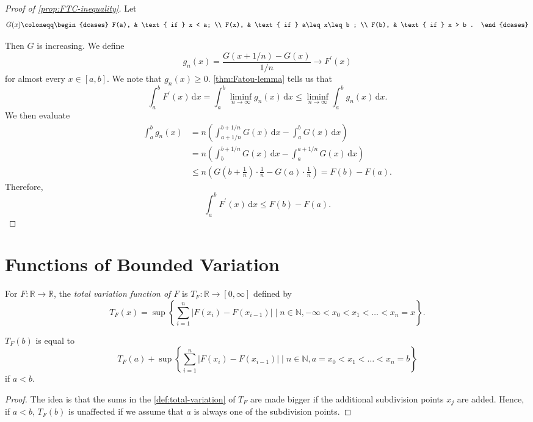 \begin{proof}[Proof of \autoref{prop:FTC-inequality}]
	Let
	\[
		G(x)\coloneqq \begin{dcases}
			F(a), & \text{ if } x < a;          \\
			F(x), & \text{ if } a\leq x\leq b ; \\
			F(b), & \text{ if } x > b .
		\end{dcases}
	\]

	Then \(G\) is increasing. We define
	\[
		g_n(x) = \frac{G(x+1/n)- G(x)}{1/n} \to F^\prime (x)
	\]
	for almost every \(x \in [a,b]\). We note that \(g_n(x) \geq 0\). \autoref{thm:Fatou-lemma} tells us that
	\[
		\int_a^b F^\prime (x) \,\mathrm{d} x = \int_a^b \liminf_{n \to \infty} g_n(x) \,\mathrm{d} x \leq \liminf_{n \to \infty} \int_a^b g_n(x) \,\mathrm{d} x.
	\]
	We then evaluate
	\[
		\begin{split}
			\int_a^b g_n(x) & = n\left( \int_{a+1/n}^{b+1/n} G(x) \,\mathrm{d} x - \int_a^b G(x) \,\mathrm{d} x \right)        \\
			                & = n\left( \int_b^{b+1/n} G(x) \,\mathrm{d} x - \int_a^{a+1/n} G(x) \,\mathrm{d} x \right)        \\
			                & \leq n\left( G\left( b + \frac{1}{n} \right) \cdot \frac{1}{n} - G(a) \cdot \frac{1}{n}  \right)
			= F(b) - F(a).
		\end{split}
	\]
	Therefore,
	\[
		\int_a^b F^\prime (x) \,\mathrm{d} x \leq F(b) - F(a).
	\]
\end{proof}

\section{Functions of Bounded Variation}
\begin{definition}\label{def:total-variation-function}
	For \(F \colon \mathbb{R} \to \mathbb{R}\), the \emph{total variation function of \(F\)} is \(T_F \colon \mathbb{R} \to [0,\infty]\) defined by
	\[
		T_F(x) = \sup \left\{\sum_{i=1}^n \left\vert F(x_i) - F(x_{i-1}) \right\vert \mid n \in \mathbb{N}, -\infty < x_0 < x_1 < \dots < x_n = x\right\}.
	\]
\end{definition}

\begin{lemma}\label{lma:lec34-1}
	\(T_F(b)\) is equal to
	\[
		T_F(a) + \sup \left\{\sum_{i=1}^n \left\vert F(x_i) - F(x_{i-1}) \right\vert \mid n \in \mathbb{N}, a = x_0 < x_1 < \dots < x_n = b\right\}
	\]
	if \(a < b\).
\end{lemma}
\begin{proof}
	The idea is that the sums in the \autoref{def:total-variation} of \(T_F\) are made bigger if the additional subdivision points \(x_{j} \) are added. Hence,
	if \(a <b\), \(T_F(b)\) is unaffected if we assume that \(a\) is always one of the subdivision points.
\end{proof}

